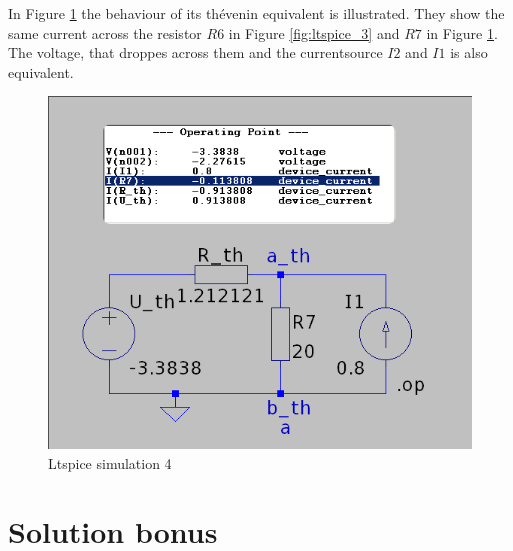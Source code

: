 \documentclass[a4paper]{article}
\begin{document}
\clearpage
In Figure \ref{fig:ltspice_4} the behaviour of its thévenin equivalent is illustrated. They show the same current across
the resistor $R6$ in Figure \ref{fig:ltspice_3} and $R7$ in Figure \ref{fig:ltspice_4}. The voltage,
that droppes across them and the currentsource $I2$ and $I1$ is also equivalent.
\begin{figure}[h!]\centering
   \includegraphics[scale=0.5]{./Figures/ltspice_equivalent.png} 
\caption{Ltspice simulation 4}
\label{fig:ltspice_4}
\end{figure}
\newpage
\section{Solution bonus}
\end{document}
